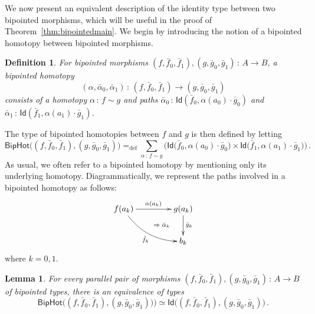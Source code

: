 \documentclass[10pt,a4paper,oneside,reqno]{amsart}
\theoremstyle{mythm}
\newtheorem{lemma}[theorem]{Lemma}
\theoremstyle{mydef}
\newtheorem{definition}[theorem]{Definition}
\theoremstyle{myrmk}
\newcommand{\defeq}{=_{\mathrm{def}}}
\newcommand{\co}{\,{:}\,}
\newcommand{\ct}{\cdot}
\newcommand{\Id}{\mathsf{Id}}
\newcommand{\BipHot}{\mathsf{BipHot}}
\begin{document}
We now present an equivalent description of the identity type between two bipointed morphisms, which 
will be useful in the proof of Theorem~\ref{thm:bipointedmain}. We begin by introducing the notion of a bipointed homotopy between bipointed morphisms.





\begin{definition} \label{thm:biphomotopy} For bipointed morphisms $(f, \bar{f}_0, \bar{f}_1) , (g, \bar{g}_0, \bar{g}_1) \co A \to B$, 
a \emph{bipointed homotopy} 
\[
(\alpha, \bar{\alpha}_0, \bar{\alpha}_1) \co (f, \bar{f}_0, \bar{f}_1) \to  (g, \bar{g}_0, \bar{g}_1)
\] 
consists of a homotopy $\alpha \co  f \sim g$ and paths
$\bar{\alpha}_0 \co \Id(  \bar{f}_0 , \alpha(a_0)  \cdot \bar{g}_0)$ and $\bar{\alpha}_1 \co \Id(
\bar{f}_1 , \alpha(a_1) \cdot \bar{g}_1)$. 
\end{definition}

The type of bipointed homotopies between $f$ and $g$ is then defined by letting
\[
 \BipHot  \big( (f,\bar{f}_0, \bar{f}_1), (g, \bar{g}_0, \bar{g}_1) \big)   \defeq   
 \sum_{\alpha \co f \sim g}  \big( 
  \Id\big( \bar{f}_0 ,  \alpha(a_0)  \ct \bar{g}_0 \big) \times 
  \Id \big( \bar{f}_1,  \alpha(a_1) \ct  \bar{g}_1 \big) \big) \, .
\]
As usual, we often refer to a bipointed homotopy by mentioning only its underlying homotopy.
Diagrammatically, we represent the paths  involved in a bipointed homotopy as follows:
\[
\xymatrix@C=1.5cm{
f(a_k) \ar[r]^{\alpha(a_k)}  \ar@/_1pc/[dr]_{\bar{f}_k}  
\ar@{}[dr]|{\qquad \Rightarrow \; \bar{\alpha}_k}  & g(a_k) \ar[d]^{\bar{g}_k}  \\ 
 & b_k }
  \] 
where $k = 0, 1$. 


\begin{lemma} \label{BoolHomSpace} 
For every parallel pair of morphisms $(f, \bar{f}_0, \bar{f}_1), (g, \bar{g}_0, \bar{g}_1) \co A \to B$ of bipointed types, there is an equivalence of types
\[
\BipHot\big( (f, \bar{f}_0, \bar{f}_1), (g, \bar{g}_0, \bar{g}_1) ) \big) \simeq 
\Id \big( (f, \bar{f}_0, \bar{f}_1), (g, \bar{g}_0, \bar{g}_1) \big)\, .
\]
\end{lemma}
\end{document}
